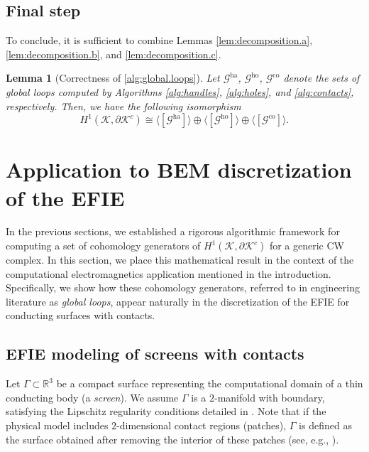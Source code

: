 \documentclass[a4paper,twoside,10pt]{article}
\theoremstyle{plain}
\newtheorem{lemma}{Lemma}
\theoremstyle{definition}
\theoremstyle{remark}
\newcommand{\mc}{\mathcal}
\newcommand{\K}{\mc{K}}
\newcommand{\eqclassspan}[1]{\langle{[#1]}\rangle}
\newcommand{\ha}{\mathrm{ha}}
\newcommand{\ho}{\mathrm{ho}}
\newcommand{\co}{\mathrm{co}}
\begin{document}
\subsection{Final step}
To conclude, it is sufficient to combine Lemmas \ref{lem:decomposition.a}, \ref{lem:decomposition.b}, and \ref{lem:decomposition.c}.
\begin{lemma}[Correctness of \cref{alg:global.loops}]
Let $\mc G^{\ha}$, $\mc G^{\ho}$, $\mc G^{\co}$ denote the sets of global loops computed by Algorithms \ref{alg:handles}, \ref{alg:holes}, and \ref{alg:contacts}, respectively.
Then, we have the following isomorphism
\[
H^1(\K, \partial \K^{c}) \cong \eqclassspan{\mc G^{\ha}} \oplus \eqclassspan{\mc G^{\ho}} \oplus \eqclassspan{\mc G^{\co}}.
\]
\end{lemma}


\section{Application to BEM discretization of the EFIE}
\label{sec:EFIE}
In the previous sections, we established a rigorous algorithmic framework for computing a set of cohomology generators of $H^1(\K, \partial \K^c)$ for a generic CW complex.
In this section, we place this mathematical result in the context of the computational electromagnetics application mentioned in the introduction.
Specifically, we show how these cohomology generators, referred to in engineering literature as \emph{global loops}, appear naturally in the discretization of the EFIE for conducting surfaces with contacts.
\subsection{EFIE modeling of screens with contacts}
Let $\Gamma \subset \mathbb{R}^3$ be a compact surface representing the computational domain of a thin conducting body (a \emph{screen}).
We assume $\Gamma$ is a $2$-manifold with boundary, satisfying the Lipschitz regularity conditions detailed in \cite[Section 1.1]{buffa2003electric}.
Note that if the physical model includes $2$-dimensional contact regions (patches), $\Gamma$ is defined as the surface obtained after removing the interior of these patches (see, e.g., \cite[Section~II]{miano2005surface}).
\end{document}

